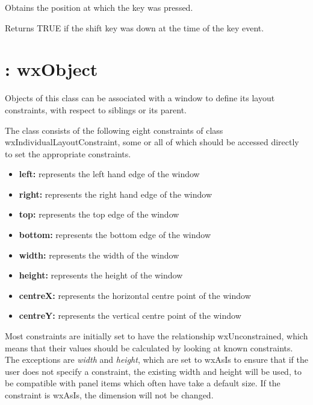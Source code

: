 

Obtains the position at which the key was pressed.



Returns TRUE if the shift key was down at the time of the key event.

\section{: wxObject}\label{wxlayoutconstraints}


Objects of this class can be associated with a window to define its
layout constraints, with respect to siblings or its parent.

The class consists of the following eight constraints of class wxIndividualLayoutConstraint,
some or all of which should be accessed directly to set the appropriate
constraints.

\begin{itemize}\itemsep=0pt
\item {\bf left:} represents the left hand edge of the window
\item {\bf right:} represents the right hand edge of the window
\item {\bf top:} represents the top edge of the window
\item {\bf bottom:} represents the bottom edge of the window
\item {\bf width:} represents the width of the window
\item {\bf height:} represents the height of the window
\item {\bf centreX:} represents the horizontal centre point of the window
\item {\bf centreY:} represents the vertical centre point of the window
\end{itemize}

Most constraints are initially set to have the relationship wxUnconstrained,
which means that their values should be calculated by looking at known constraints.
The exceptions are {\it width} and {\it height}, which are set to wxAsIs to
ensure that if the user does not specify a constraint, the existing
width and height will be used, to be compatible with panel items which often
have take a default size. If the constraint is wxAsIs, the dimension will
not be changed.

